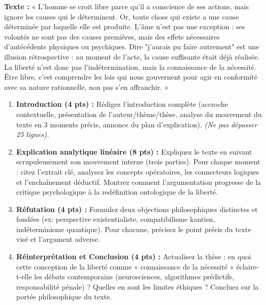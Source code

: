 \documentclass[11pt]{article}
\begin{document}
\begin{exercice}
\textbf{Texte :} « L'homme se croit libre parce qu'il a conscience de ses actions, mais ignore les causes qui le déterminent. Or, toute chose qui existe a une cause déterminée par laquelle elle est produite. L'âme n'est pas une exception : ses volontés ne sont pas des causes premières, mais des effets nécessaires d'antécédents physiques ou psychiques. Dire "j'aurais pu faire autrement" est une illusion rétrospective : au moment de l'acte, la cause suffisante était déjà réalisée. La liberté n'est donc pas l'indétermination, mais la connaissance de la nécessité. Être libre, c'est comprendre les lois qui nous gouvernent pour agir en conformité avec sa nature rationnelle, non pas s'en affranchir. »

\begin{enumerate}
    \item \textbf{Introduction (4 pts) :} Rédigez l'introduction complète (accroche contextuelle, présentation de l'auteur/thème/thèse, analyse du mouvement du texte en 3 moments précis, annonce du plan d'explication). \textit{(Ne pas dépasser 25 lignes).}
    \item \textbf{Explication analytique linéaire (8 pts) :} Expliquez le texte en suivant scrupuleusement son mouvement interne (trois parties). Pour chaque moment : citez l'extrait clé, analysez les concepts opératoires, les connecteurs logiques et l'enchaînement déductif. Montrez comment l'argumentation progresse de la critique psychologique à la redéfinition ontologique de la liberté.
    \item \textbf{Réfutation (4 pts) :} Formulez deux objections philosophiques distinctes et fondées (ex: perspective existentialiste, compatibilisme kantien, indéterminisme quantique). Pour chacune, précisez le point précis du texte visé et l'argument adverse.
    \item \textbf{Réinterprétation et Conclusion (4 pts) :} Actualisez la thèse : en quoi cette conception de la liberté comme « connaissance de la nécessité » éclaire-t-elle les débats contemporains (neurosciences, algorithmes prédictifs, responsabilité pénale) ? Quelles en sont les limites éthiques ? Concluez sur la portée philosophique du texte.
\end{enumerate}
\end{exercice}
\end{document}
